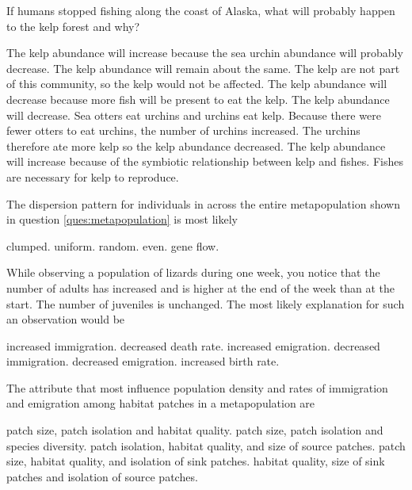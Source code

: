 \question
If humans stopped fishing along the coast of Alaska, what will probably happen to the kelp forest and why?

\begin{choices}
\correctchoice The kelp abundance will increase because the sea urchin abundance will probably decrease.%
\choice The kelp abundance will remain about the same. The kelp are not part of this community, so the kelp would not be affected.%
\choice The kelp abundance will decrease because more fish will be present to eat the kelp.%
\choice The kelp abundance will decrease. Sea otters eat urchins and urchins eat kelp. Because there were fewer otters to eat urchins, the number of urchins increased. The urchins therefore ate more kelp so the kelp abundance decreased.%
\choice The kelp abundance will increase because of the symbiotic relationship between kelp and fishes. Fishes are necessary for kelp to reproduce.%
\end{choices}



\question
The dispersion pattern for individuals in across the entire metapopulation shown in question \ref{ques:metapopulation} is most likely

\begin{choices}
	\correctchoice clumped. %
	\choice uniform. %
	\choice random. %
	\choice even. %
	\choice gene flow. %
\end{choices}


\question
While observing a population of lizards during one week, you notice that the number of adults has increased and is higher at the end of the week than at the start. The number of juveniles is unchanged. The most likely explanation for such an observation would be 

\begin{choices}
\correctchoice increased immigration.  %
\choice decreased death rate. %
\choice increased emigration.  %
\choice decreased immigration. %
\choice decreased emigration.  %
\choice increased birth rate.  %
\end{choices}
	

\question
The attribute that most influence population density and rates of immigration and emigration among habitat patches in a metapopulation are

\begin{choices}
\correctchoice patch size, patch isolation and habitat quality. %
\choice patch size, patch isolation and species diversity. %
\choice patch isolation, habitat quality, and size of source patches. %
\choice patch size, habitat quality, and isolation of sink patches. %
\choice habitat quality, size of sink patches and isolation of source patches. %
\end{choices}

